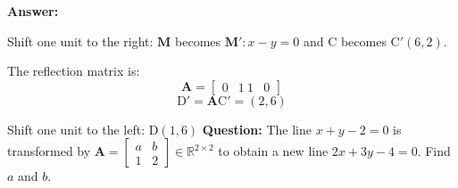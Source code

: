 \documentclass[a4paper,12pt]{report}
\begin{document}
\textbf{Answer:} 

Shift one unit to the right: $\mathbf{M}$ becomes $\mathbf{M}':x - y = 0$ and $\mathrm{C}$ becomes $\mathrm{C}'(6, 2)$.

The reflection matrix is: 
\[\mathbf{A} = \begin{bmatrix} 0 & 1 \ 1 & 0 \end{bmatrix}\]
\[\mathrm{D}' = \mathbf{A} \mathrm{C}' = (2, 6)\]

Shift one unit to the left: $\mathrm{D}(1, 6)$
\textbf{Question:} The line $x+y-2=0$ is transformed by $\mathbf{A}=\begin{bmatrix}a&b\\1&2\end{bmatrix}\in\mathbb{R}^{2\times 2}$ to obtain a new line $2x+3y-4=0$. Find $a$ and $b$.
\end{document}
